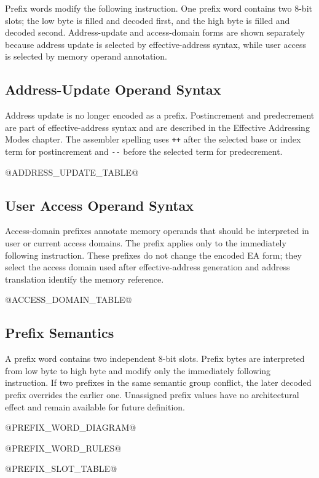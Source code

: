 Prefix words modify the following instruction. One prefix word contains two 8-bit slots; the low byte is filled
and decoded first, and the high byte is filled and decoded second. Address-update and access-domain forms are
shown separately because address update is selected by effective-address syntax, while user access is selected
by memory operand annotation.

\subsection{Address-Update Operand Syntax}
Address update is no longer encoded as a prefix. Postincrement and predecrement are part of effective-address
syntax and are described in the Effective Addressing Modes chapter. The assembler spelling uses \texttt{++}
after the selected base or index term for postincrement and \texttt{{-}{-}} before the selected term for
predecrement.

@ADDRESS_UPDATE_TABLE@

\subsection{User Access Operand Syntax}
Access-domain prefixes annotate memory operands that should be interpreted in user or current access domains.
The prefix applies only to the immediately following instruction. These prefixes do not change the encoded EA
form; they select the access domain used after effective-address generation and address translation identify the
memory reference.

@ACCESS_DOMAIN_TABLE@

\subsection{Prefix Semantics}
A prefix word contains two independent 8-bit slots. Prefix bytes are interpreted from low byte to high byte and
modify only the immediately following instruction. If two prefixes in the same semantic group conflict, the later
decoded prefix overrides the earlier one. Unassigned prefix values have no architectural effect and remain
available for future definition.

@PREFIX_WORD_DIAGRAM@

@PREFIX_WORD_RULES@

@PREFIX_SLOT_TABLE@

